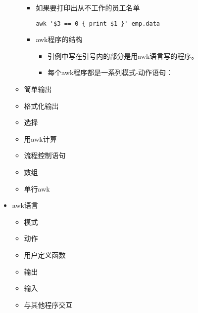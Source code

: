 \documentclass[bigger]{beamer}
\begin{document}
\begin{frame}[fragile]
\begin{itemize}
\begin{itemize}
\begin{itemize}
\item 如果要打印出从不工作的员工名单\\
\label{sec-5-1-2-1-2}%
\begin{verbatim}
awk '$3 == 0 { print $1 }' emp.data
\end{verbatim}

\item awk程序的结构
\label{sec-5-1-2-1-3}%
\begin{itemize}

\item 引例中写在引号内的部分是用awk语言写的程序。
\label{sec-5-1-2-1-3-1}%

\item 每个awk程序都是一系列模式-动作语句：
\label{sec-5-1-2-1-3-2}%
\end{itemize} %
\end{itemize} %

\item 简单输出
\label{sec-5-1-2-2}%

\item 格式化输出
\label{sec-5-1-2-3}%

\item 选择
\label{sec-5-1-2-4}%

\item 用awk计算
\label{sec-5-1-2-5}%

\item 流程控制语句
\label{sec-5-1-2-6}%

\item 数组
\label{sec-5-1-2-7}%

\item 单行awk
\label{sec-5-1-2-8}%
\end{itemize} %

\item awk语言
\label{sec-5-1-3}%
\begin{itemize}

\item 模式
\label{sec-5-1-3-1}%

\item 动作
\label{sec-5-1-3-2}%

\item 用户定义函数
\label{sec-5-1-3-3}%

\item 输出
\label{sec-5-1-3-4}%

\item 输入
\label{sec-5-1-3-5}%

\item 与其他程序交互
\label{sec-5-1-3-6}%
\end{itemize} %


\end{itemize}
\end{frame}
\end{document}
